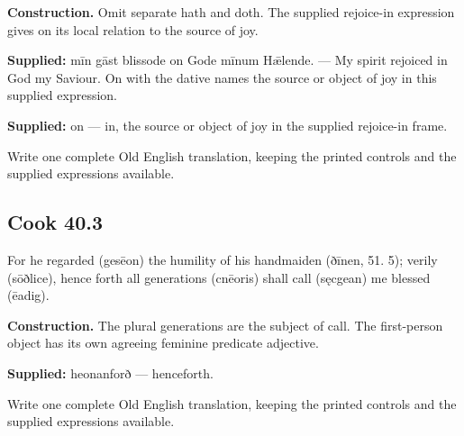 \textbf{Construction.} Omit separate hath and doth. The supplied rejoice-in expression gives on its local relation to the source of joy.

\textbf{Supplied:} mīn gāst blissode on Gode mīnum Hǣlende. — My spirit rejoiced in God my Saviour. On with the dative names the source or object of joy in this supplied expression.

\textbf{Supplied:} on — in, the source or object of joy in the supplied rejoice-in frame.

Write one complete Old English translation, keeping the printed controls and the supplied expressions available.

\par\begin{minipage}{\linewidth}\raggedright
\subsection*{Cook 40.3}

For he regarded (gesēon) the humility of his handmaiden (ðīnen, 51. 5); verily (sōðlice), hence forth all generations (cnēoris) shall call (sęcgean) me blessed (ēadig).

\textbf{Construction.} The plural generations are the subject of call. The first-person object has its own agreeing feminine predicate adjective.

\end{minipage}\par\addvspace{4pt}

\textbf{Supplied:} heonanforð — henceforth.

Write one complete Old English translation, keeping the printed controls and the supplied expressions available.

